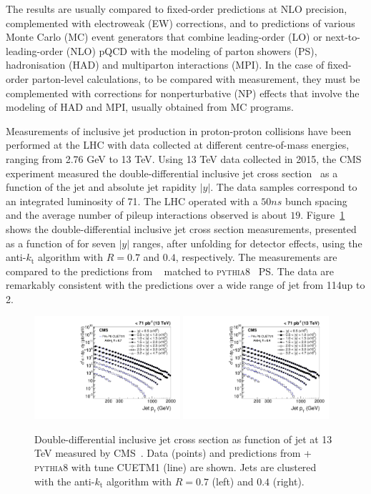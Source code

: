 \documentclass{PoS}
\providecommand{\kts}{\ensuremath{k_{\mathrm{t}}}\xspace}
\providecommand{\PYTHIAE} {{\textsc{pythia8}}\xspace}
\begin{document}
The results are usually compared to fixed-order predictions at NLO precision, complemented with electroweak (EW) corrections, and to predictions of
various Monte Carlo (MC) event generators that combine leading-order (LO) or next-to-leading-order (NLO) pQCD with the modeling of parton
showers (PS), hadronisation (HAD) and multiparton interactions (MPI).
In the case of fixed-order parton-level calculations, to be compared with measurement, they must be complemented with corrections for nonperturbative
(NP) effects that involve the modeling of HAD and MPI, usually obtained from MC programs. 

Measurements of inclusive jet production in proton-proton collisions have been performed at the LHC with data collected
at different centre-of-mass energies, ranging from 2.76 GeV to 13 TeV.  
Using 13 TeV data collected in 2015, the CMS experiment measured the double-differential inclusive jet
cross section~\cite{Khachatryan:2016wdh} as a function of the jet \pt and absolute jet rapidity $|y|$. The data samples correspond to
an integrated luminosity of 71\pbinv. The LHC operated with a $50\unit{ns}$ bunch spacing and the
average number of pileup interactions observed is about $19$.   
Figure~\ref{fig:crossSection} shows the double-differential inclusive jet cross section measurements,
presented as a function of \pt for seven $|y|$ ranges, after
unfolding for detector effects, using the anti-\kts algorithm with $R =
0.7$ and $0.4$, respectively. The measurements are compared to the predictions from \POWHEG~\cite{Alioli:2010xa}
matched to \PYTHIAE~\cite{Sjostrand:2007gs} PS. The data are remarkably consistent with the predictions over a wide range of jet \pt from 114\GeV up to
2\TeV.
\begin{figure}[htbp] \centering
  \includegraphics[width=0.48\textwidth]{Figure1-a.pdf}
  \includegraphics[width=0.48\textwidth]{Figure1-b.pdf}
  \caption{Double-differential inclusive jet cross section as function of jet \pt at 13 TeV measured by CMS~\cite{Khachatryan:2016wdh}. Data (points) and
predictions from \POWHEG + \PYTHIAE with tune CUETM1 (line) are shown. Jets are clustered with the anti-\kts
algorithm with $R = 0.7$ (left) and $0.4$ (right).}
  \label{fig:crossSection}
\end{figure}
\end{document}
